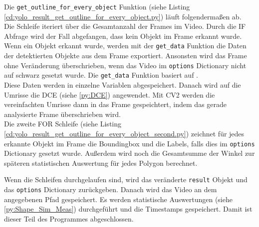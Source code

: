 {	Die \lstinline|get_outline_for_every_object| Funktion (siehe Listing \ref{cd:yolo_result_get_outline_for_every_object.py}) läuft folgendermaßen ab. \\
	Die Schleife iteriert über die Gesamtanzahl der Frames im Video. Durch die IF Abfrage wird der Fall abgefangen, dass kein Objekt im Frame erkannt wurde. Wenn ein Objekt erkannt wurde, werden mit der \lstinline|get_data| Funktion die Daten der detektierten Objekte aus dem Frame exportiert. Ansonsten wird das Frame ohne Veränderung überschrieben, wenn das Video im \lstinline|options| Dictionary nicht auf schwarz gesetzt wurde. Die \lstinline|get_data| Funktion basiert auf \citeauthor{Canu_pysource} \citep{Canu_pysource}. \\
	Diese Daten werden in einzelne Variablen abgespeichert. Danach wird auf die Umrisse die DCE (siehe \ref{py:DCE}) angewendet. Mit CV2 werden die vereinfachten Umrisse dann in das Frame gespeichtert, indem das gerade analysierte Frame überschrieben wird. \\
	
	Die zweite FOR Schleife (siehe Listing \ref{cd:yolo_result_get_outline_for_every_object_second.py}) zeichnet für jedes erkannte Objekt im Frame die Boundingbox und die Labels, falls dies im \lstinline|options| Dictionary gesetzt wurde. Außerdem wird noch die Gesamtsumme der Winkel  zur späteren statistischen Auswertung für jedes Polygon berechnet.
	
	Wenn die Schleifen durchgelaufen sind, wird das veränderte \lstinline|result| Objekt und das \lstinline|options| Dictionary zurückgeben. Danach wird das Video an dem angegebenen Pfad gespeichert. Es werden statistische Auswertungen (siehe \ref{py:Shape_Sim_Meas}) durchgeführt und die Timestamps gespeichert. Damit ist dieser Teil des  Programmes abgeschlossen. \\
	}

